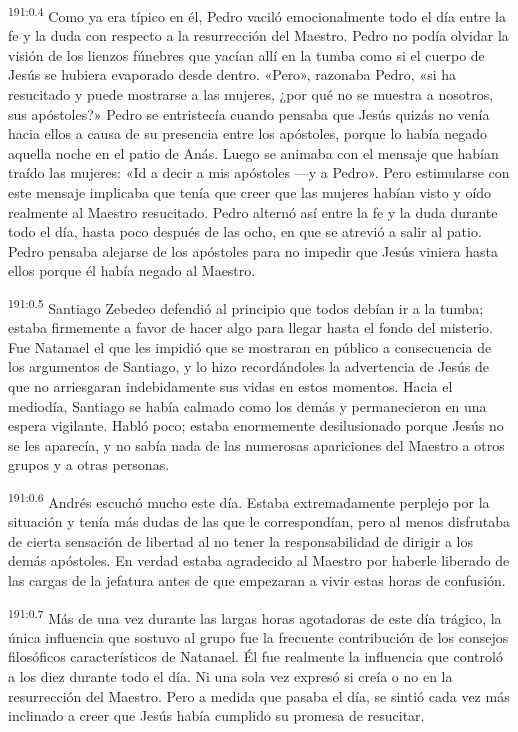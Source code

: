 \par 
\textsuperscript{191:0.4} Como ya era típico en él, Pedro vaciló emocionalmente todo el día entre la fe y la duda con respecto a la resurrección del Maestro. Pedro no podía olvidar la visión de los lienzos fúnebres que yacían allí en la tumba como si el cuerpo de Jesús se hubiera evaporado desde dentro. «Pero», razonaba Pedro, «si ha resucitado y puede mostrarse a las mujeres, ¿por qué no se muestra a nosotros, sus apóstoles?» Pedro se entristecía cuando pensaba que Jesús quizás no venía hacia ellos a causa de su presencia entre los apóstoles, porque lo había negado aquella noche en el patio de Anás. Luego se animaba con el mensaje que habían traído las mujeres: «Id a decir a mis apóstoles ---y a Pedro». Pero estimularse con este mensaje implicaba que tenía que creer que las mujeres habían visto y oído realmente al Maestro resucitado. Pedro alternó así entre la fe y la duda durante todo el día, hasta poco después de las ocho, en que se atrevió a salir al patio. Pedro pensaba alejarse de los apóstoles para no impedir que Jesús viniera hasta ellos porque él había negado al Maestro.

\par 
\textsuperscript{191:0.5} Santiago Zebedeo defendió al principio que todos debían ir a la tumba; estaba firmemente a favor de hacer algo para llegar hasta el fondo del misterio. Fue Natanael el que les impidió que se mostraran en público a consecuencia de los argumentos de Santiago, y lo hizo recordándoles la advertencia de Jesús de que no arriesgaran indebidamente sus vidas en estos momentos. Hacia el mediodía, Santiago se había calmado como los demás y permanecieron en una espera vigilante. Habló poco; estaba enormemente desilusionado porque Jesús no se les aparecía, y no sabía nada de las numerosas apariciones del Maestro a otros grupos y a otras personas.

\par 
\textsuperscript{191:0.6} Andrés escuchó mucho este día. Estaba extremadamente perplejo por la situación y tenía más dudas de las que le correspondían, pero al menos disfrutaba de cierta sensación de libertad al no tener la responsabilidad de dirigir a los demás apóstoles. En verdad estaba agradecido al Maestro por haberle liberado de las cargas de la jefatura antes de que empezaran a vivir estas horas de confusión.

\par 
\textsuperscript{191:0.7} Más de una vez durante las largas horas agotadoras de este día trágico, la única influencia que sostuvo al grupo fue la frecuente contribución de los consejos filosóficos característicos de Natanael. Él fue realmente la influencia que controló a los diez durante todo el día. Ni una sola vez expresó si creía o no en la resurrección del Maestro. Pero a medida que pasaba el día, se sintió cada vez más inclinado a creer que Jesús había cumplido su promesa de resucitar.

